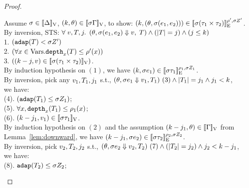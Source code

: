 \documentclass[a4paper,11pt]{article}
\theoremstyle{definition}
\begin{document}
\begin{proof}
\begin{mainitem}
Assume $ \ienv \in \lrv{\Delta}$, $(\stepiA, \env) \in \lrv{\ienv \Gamma}$, 
to show: $(\stepiA, (\env, \ienv (\expr_1, \expr_2))) \in \lre{\dmap'}{\ienv \nnatA'}{\ienv (\type_1 \times \type_2)}$.\\
%
By inversion, STS: $\forall \eapp  \valr, \tr, j.$ 
$(\env, \ienv (\expr_1, \expr_2) \bigstep \valr, \eapp  \tr) \land (\size{\tr} = j) \land (j \leq \stepiA)$\\
%
1. $ (\adap(\tr) < \ienv \nnatA')$\\
2. $ (\forall x \in \mbox{Vars}. \ddep{x}(\tr) \leq \dmap'(x)) $\\
3. $ ((\stepiA - j, \valr) \in \lrv{\ienv (\type_1 \times \type_2)})$.\\
%
By induction hypothesis on $(1)$, we have $(\stepiA, \ienv \expr_1) \in \lre{\dmap_1}{\ienv \nnatA_1}{\ienv  \type_1}$.\\
%
By inversion, pick any $\valr_1,  \tr_1, j_1$ s.t.,
$(\env, \ienv \expr_1 \bigstep \valr_1, \tr_1) ~ (3) 
\land \size{\tr_1} = j_1
\land j_1 < \stepiA $,\\
%
we have: \\
(4). $(\adap(\tr_1) \leq \ienv  \nnatA_1)$;\\
% 
(5). $\forall x, \ddep{x}(\tr_1) \leq \dmap_1(x)$;\\
% 
(6). $ (\stepiA - j_1, \valr_1) \in \lrv{\ienv  \type_1} $.\\
%
By induction hypothesis on $(2)$ and the assumption $(\stepiA - j_1,
\env) \in \lrv{\Gamma}$ from Lemma~\ref{lem:downward}, we have $(\stepiA - j_1, \ienv  \expr_2) \in \lre{\dmap_2}{\ienv  \nnatA_2}{\ienv  \type_2}$.\\
%
By inversion, pick $\valr_2, \tr_2, j_2 $ s.t., $ (\env, \ienv \expr_2 \bigstep \valr_2, \tr_2) ~ (7) \land (\size{\tr_2} = j_2) \land j_2 < \stepiA-j_1 $,\\
%
we have:\\
(8). $\adap(\tr_2) \leq \ienv  \nnatA_2$;\\
%

\end{mainitem}
\end{proof}
\end{document}
